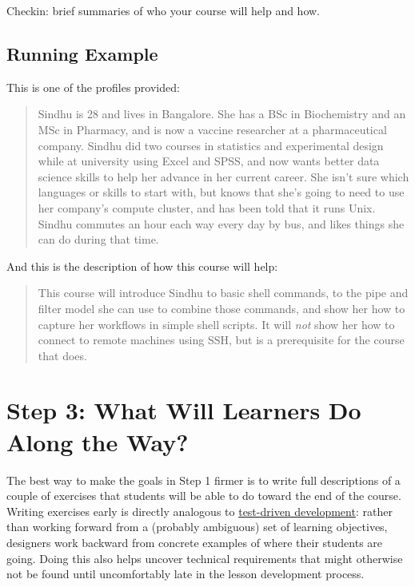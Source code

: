 \documentclass[10pt,statementpaper]{memoir}
\begin{document}
Checkin: brief summaries of who your course will help and how.

\subsection*{Running Example}\label{running-example-1}

This is one of the profiles provided:

\begin{quote}
Sindhu is 28 and lives in Bangalore. She has a BSc in Biochemistry and
an MSc in Pharmacy, and is now a vaccine researcher at a pharmaceutical
company. Sindhu did two courses in statistics and experimental design
while at university using Excel and SPSS, and now wants better data
science skills to help her advance in her current career. She isn't sure
which languages or skills to start with, but knows that she's going to
need to use her company's compute cluster, and has been told that it
runs Unix. Sindhu commutes an hour each way every day by bus, and likes
things she can do during that time.
\end{quote}

And this is the description of how this course will help:

\begin{quote}
This course will introduce Sindhu to basic shell commands, to the pipe
and filter model she can use to combine those commands, and show her how
to capture her workflows in simple shell scripts. It will \emph{not}
show her how to connect to remote machines using SSH, but is a
prerequisite for the course that does.
\end{quote}

\section{Step 3: What Will Learners Do Along the
Way?}\label{step-3-what-will-learners-do-along-the-way}

The best way to make the goals in Step 1 firmer is to write full
descriptions of a couple of exercises that students will be able to do
toward the end of the course. Writing exercises early is directly
analogous to
\href{https://en.wikipedia.org/wiki/Test-driven_development}{test-driven
development}: rather than working forward from a (probably ambiguous)
set of learning objectives, designers work backward from concrete
examples of where their students are going. Doing this also helps
uncover technical requirements that might otherwise not be found until
uncomfortably late in the lesson development process.
\end{document}
